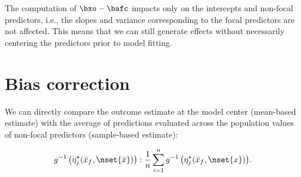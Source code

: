 The computation of $\bxo - \bafc$ impacts only on the intercepts and non-focal predictors, i.e., the slopes and variance corresponding to the focal predictors are not affected. This means that we can still generate effects without necessarily centering the predictors prior to model fitting. 


\section{Bias correction}

We can directly compare the outcome estimate at the model center (mean-based estimate) with the average of predictions evaluated across the population values of non-focal predictors (sample-based estimate):

\begin{align}\label{eq:compare_anchored_pop_based}
g^{-1} \left(\eta_j^\star(\bar{x}_f, \nset{\bar{x}})\right) : \frac{1}{n} \sum_{i=1}^n{ g^{-1} \left(\eta_j^\star(\bar{x}_f, \nset{x})\right)}.
\end{align}

